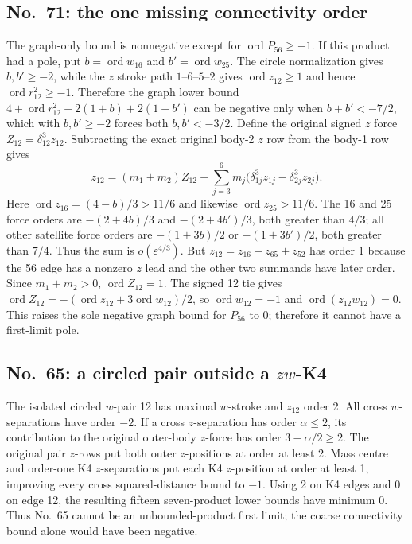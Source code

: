 \documentclass[11pt]{amsart}
\theoremstyle{remark}
\newcommand{\ord}{\operatorname{ord}}
\begin{document}
\subsection{No.~71: the one missing connectivity order}\label{sec:no71-satellite}
The graph-only bound is nonnegative except for $\ord P_{56}\ge-1$. If this product had a pole, put $b=\ord w_{16}$ and $b'=\ord w_{25}$. The circle normalization gives $b,b'\ge-2$, while the $z$ stroke path $1$--$6$--$5$--$2$ gives $\ord z_{12}\ge1$ and hence $\ord r_{12}^2\ge-1$. Therefore the graph lower bound $4+\ord r_{12}^2+2(1+b)+2(1+b')$ can be negative only when $b+b'<-7/2$, which with $b,b'\ge-2$ forces both $b,b'<-3/2$. Define the original signed $z$ force $Z_{12}=\delta_{12}^3z_{12}$. Subtracting the exact original body-2 $z$ row from the body-1 row gives
\[
z_{12}=(m_1+m_2)Z_{12}+
\sum_{j=3}^{6}m_j\bigl(\delta_{1j}^3z_{1j}-\delta_{2j}^3z_{2j}\bigr).
\]
Here $\ord z_{16}=(4-b)/3>11/6$ and likewise $\ord z_{25}>11/6$. The 16 and 25 force orders are $-(2+4b)/3$ and $-(2+4b')/3$, both greater than $4/3$; all other satellite force orders are $-(1+3b)/2$ or $-(1+3b')/2$, both greater than $7/4$. Thus the sum is $o(\varepsilon^{4/3})$. But $z_{12}=z_{16}+z_{65}+z_{52}$ has order $1$ because the 56 edge has a nonzero $z$ lead and the other two summands have later order. Since $m_1+m_2>0$, $\ord Z_{12}=1$. The signed 12 tie gives $\ord Z_{12}=-(\ord z_{12}+3\ord w_{12})/2$, so $\ord w_{12}=-1$ and $\ord(z_{12}w_{12})=0$. This raises the sole negative graph bound for $P_{56}$ to $0$; therefore it cannot have a first-limit pole.

\subsection{No.~65: a circled pair outside a $zw$-K4}\label{sec:no65-pair}
The isolated circled $w$-pair 12 has maximal $w$-stroke and $z_{12}$ order 2. All cross $w$-separations have order $-2$. If a cross $z$-separation has order $\alpha\le2$, its contribution to the original outer-body $z$-force has order $3-\alpha/2\ge2$. The original pair $z$-rows put both outer $z$-positions at order at least 2. Mass centre and order-one K4 $z$-separations put each K4 $z$-position at order at least 1, improving every cross squared-distance bound to $-1$. Using 2 on K4 edges and 0 on edge 12, the resulting fifteen seven-product lower bounds have minimum 0. Thus No.~65 cannot be an unbounded-product first limit; the coarse connectivity bound alone would have been negative.
\end{document}
